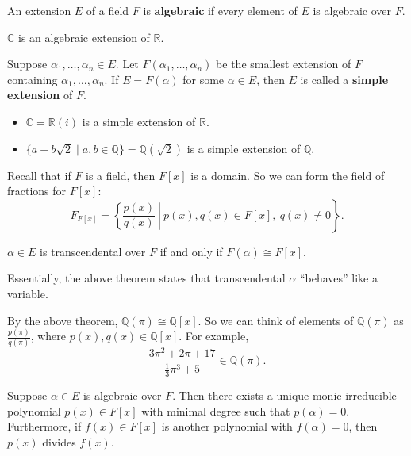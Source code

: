 \begin{definition}
	An extension $E$ of a field $F$ is \textbf{algebraic} if every element of $E$ is algebraic over $F$.
\end{definition}

\begin{example}
	$\mathbb C$ is an algebraic extension of $\mathbb R$.
\end{example}

\begin{definition}
	Suppose $\alpha_1,\hdots,\alpha_n\in E$. Let $F(\alpha_1,\hdots,\alpha_n)$ be the smallest extension of $F$ containing $\alpha_1,\hdots,\alpha_n$. If $E=F(\alpha)$ for some $\alpha\in E$, then $E$ is called a \textbf{simple extension} of $F$.
\end{definition}

\begin{example}\phantom{x}
	\begin{itemize}
		\item $\mathbb C=\mathbb R(i)$ is a simple extension of $\mathbb R$.
		\item $\{a+b\sqrt 2\mid a,b\in\mathbb Q\}=\mathbb Q(\sqrt 2)$ is a simple extension of $\mathbb Q$.
	\end{itemize}
\end{example}

Recall that if $F$ is a field, then $F[x]$ is a domain. So we can form the field of fractions for $F[x]$:
$$F_{F[x]}=\left.\left\{\frac{p(x)}{q(x)}~\right|~p(x),q(x)\in F[x],~q(x)\neq 0\right\}.$$

\begin{theorem}
	$\alpha\in E$ is transcendental over $F$ if and only if $F(\alpha)\cong F[x]$.
\end{theorem}

Essentially, the above theorem states that transcendental $\alpha$ ``behaves'' like a variable.

\begin{example}
	By the above theorem, $\mathbb Q(\pi)\cong\mathbb Q[x]$. So we can think of elements of $\mathbb Q(\pi)$ as $\frac{p(\pi)}{q(\pi)}$, where $p(x),q(x)\in\mathbb Q[x]$. For example,
	$$\frac{3\pi^2+2\pi+17}{\frac 13\pi^3+5}\in\mathbb Q(\pi).$$
\end{example}

\begin{theorem}\label{thm:minimal_poly}
	Suppose $\alpha\in E$ is algebraic over $F$. Then there exists a unique monic irreducible polynomial $p(x)\in F[x]$ with minimal degree such that $p(\alpha)=0$. Furthermore, if $f(x)\in F[x]$ is another polynomial with $f(\alpha)=0$, then $p(x)$ divides $f(x)$.
\end{theorem}

